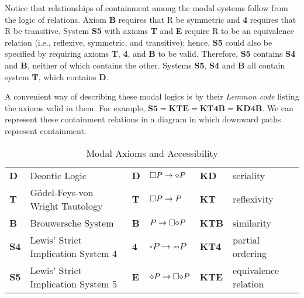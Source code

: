 \documentclass[
  12pt,
  letterpaper,
  DIV=11,
  numbers=noendperiod,
  twoside]{scrreprt}
\theoremstyle{remark}
\begin{document}
Notice that relationships of containment among the modal systems follow
from the logic of relations. Axiom \textbf{B} requires that R be
symmetric and \textbf{4} requires that R be transitive. System
\textbf{S5} with axioms \textbf{T} and \textbf{E} require R to be an
equivalence relation (i.e., reflexive, symmetric, and transitive);
hence, \textbf{S5} could also be specified by requiring axioms
\textbf{T}, \textbf{4}, and \textbf{B} to be valid. Therefore,
\textbf{S5} contains \textbf{S4} and \textbf{B}, neither of which
contains the other. Systems \textbf{S5}, \textbf{S4} and \textbf{B} all
contain system \textbf{T}, which contains \textbf{D}.

A convenient way of describing these modal logics is by their
\emph{Lemmon code} listing the axioms valid in them. For example,
\(\mathbf{S5} = \mathbf{KTE} = \mathbf{KT4B} = \mathbf{KD4B}\). We can
represent these containment relations in a diagram in which downward
paths represent containment.

\begin{longtable}[]{@{}
  >{\centering\arraybackslash}p{}
  >{\raggedright\arraybackslash}p{}
  >{\centering\arraybackslash}p{}
  >{\raggedright\arraybackslash}p{}
  >{\centering\arraybackslash}p{}
  >{\raggedright\arraybackslash}p{}@{}}
\caption{Modal Axioms and
Accessibility}\label{tbl-modal-axioms-and-accessibility}\tabularnewline
\toprule\noalign{}
\endfirsthead
\endhead
\bottomrule\noalign{}
\endlastfoot
\textbf{D} & Deontic Logic & \textbf{D} &
\({\small\square} P \rightarrow {\Large\diamond} P\) & \textbf{KD} &
seriality \\
\textbf{T} & Gödel-Feys-von Wright Tautology & \textbf{T} &
\({\small\square} P \rightarrow P\) & \textbf{KT} & reflexivity \\
\textbf{B} & Brouwersche System & \textbf{B} &
\(P \rightarrow \square {\Large\diamond} P\) & \textbf{KTB} &
similarity \\
\textbf{S4} & Lewis' Strict Implication System 4 & \textbf{4} &
\(\square P \rightarrow \square \square P\) & \textbf{KT4} & partial
ordering \\
\textbf{S5} & Lewis' Strict Implication System 5 & \textbf{E} &
\({\Large\diamond} P \rightarrow \square {\Large\diamond} P\) &
\textbf{KTE} & equivalence relation \\
\end{longtable}
\end{document}
